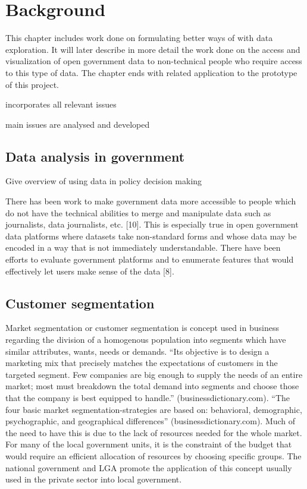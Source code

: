 \chapter{Background}
This chapter includes work done on formulating better ways of with data exploration. It will later describe in more detail the work done on the access and visualization of open government data to non-technical people who require access to this type of data. The chapter ends with related application to the prototype of this project.\par

incorporates all relevant issues\par
main issues are analysed and developed\par

\section{Data analysis in government}
Give overview of using data in policy decision making\par
 
There has been work to make government data more accessible to people which do not have the technical abilities to merge and manipulate data such as journalists, data journalists, etc. [10]. This is especially true in open government data platforms where datasets take non-standard forms and whose data may be encoded in a way that is not immediately understandable. There have been efforts to evaluate government platforms and to enumerate features that would effectively let users make sense of the data [8].

\section{Customer segmentation}
Market segmentation or customer segmentation is concept used in business regarding the division of a homogenous population into segments which have similar attributes, wants, needs or demands. “Its objective is to design a marketing mix that precisely matches the expectations of customers in the targeted segment. Few companies are big enough to supply the needs of an entire market; most must breakdown the total demand into segments and choose those that the company is best equipped to handle.” (businessdictionary.com). “The four basic market segmentation-strategies are based on: behavioral, demographic, psychographic, and geographical differences” (businessdictionary.com). Much of the need to have this is due to the lack of resources needed for the whole market. For many of the local government units, it is the constraint of the budget that would require an efficient allocation of resources by choosing specific groups. The national government and LGA promote the application of this concept usually used in the private sector into local government.\par
 
